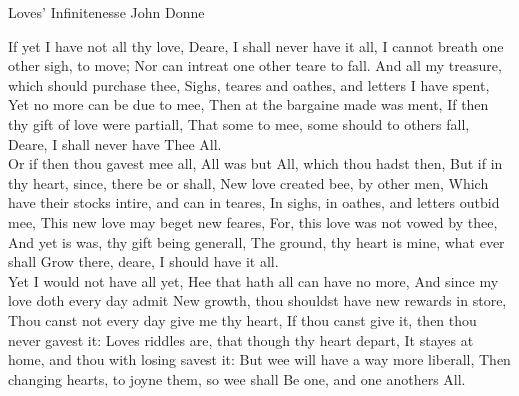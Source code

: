 \begin{poem}
{Loves' Infinitenesse}
{John Donne}
 
If yet I have not all thy love, 
Deare, I shall never have it all, 
I cannot breath one other sigh, to move; 
Nor can intreat one other teare to fall. 
And all my treasure, which should purchase thee, 
Sighs, teares and oathes, and letters I have spent, 
Yet no more can be due to mee, 
Then at the bargaine made was ment, 
If then thy gift of love were partiall, 
That some to mee, some should to others fall, 
   Deare, I shall never have Thee All.\\

Or if then thou gavest mee all, 
All was but All, which thou hadst then, 
But if in thy heart, since, there be or shall, 
New love created bee, by other men, 
Which have their stocks intire, and can in teares, 
In sighs, in oathes, and letters outbid mee, 
This new love may beget new feares, 
For, this love was not vowed by thee, 
And yet is was, thy gift being generall, 
The ground, thy heart is mine, what ever shall 
   Grow there, deare, I should have it all.\\

Yet I would not have all yet, 
Hee that hath all can have no more, 
And since my love doth every day admit 
New growth, thou shouldst have new rewards in store, 
Thou canst not every day give me thy heart, 
If thou canst give it, then thou never gavest it: 
Loves riddles are, that though thy heart depart, 
It stayes at home, and thou with losing savest it: 
But wee will have a way more liberall, 
Then changing hearts, to joyne them, so wee shall 
   Be one, and one anothers All.\\
\end{poem}

